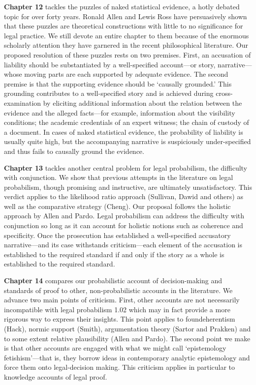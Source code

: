 \documentclass[
  10pt,
  dvipsnames,enabledeprecatedfontcommands]{scrartcl}
\begin{document}
\textbf{Chapter 12} tackles the puzzles of naked statistical evidence, a
hotly debated topic for over forty years. Ronald Allen and Lewis Ross
have persuasively shown that these puzzles are theoretical constructions
with little to no significance for legal practice. We still devote an
entire chapter to them because of the enormous scholarly attention they
have garnered in the recent philosophical literature. Our proposed
resolution of these puzzles rests on two premises. First, an accusation
of liability should be substantiated by a well-specified account---or
story, narrative---whose moving parts are each supported by adequate
evidence. The second premise is that the supporting evidence should be
`causally grounded.' This grounding contributes to a well-specified
story and is achieved during cross-examination by eliciting additional
information about the relation between the evidence and the alleged
facts---for example, information about the visibility conditions; the
academic credentials of an expert witness; the chain of custody of a
document. In cases of naked statistical evidence, the probability of
liability is usually quite high, but the accompanying narrative is
suspiciously under-specified and thus fails to causally ground the
evidence.

\textbf{Chapter 13} tackles another central problem for legal
probabilism, the difficulty with conjunction. We show that previous
attempts in the literature on legal probabilism, though promising and
instructive, are ultimately unsatisfactory. This verdict applies to the
likelihood ratio approach (Sullivan, Dawid and others) as well as the
comparative strategy (Cheng). Our proposal follows the holistic approach
by Allen and Pardo. Legal probabilism can address the difficulty with
conjunction so long as it can account for holistic notions such as
coherence and specificity. Once the prosecution has established a
well-specified accusatory narrative---and its case withstands
criticism---each element of the accusation is established to the
required standard if and only if the story as a whole is established to
the required standard.

\textbf{Chapter 14} compares our probabilistic account of
decision-making and standards of proof to other, non-probabilistic
accounts in the literature. We advance two main points of criticism.
First, other accounts are not necessarily incompatible with legal
probabilism 1.02 which may in fact provide a more rigorous way to
express their insights. This point applies to foundeherentism (Hack),
normic support (Smith), argumentation theory (Sartor and Prakken) and to
some extent relative plausibility (Allen and Pardo). The second point we
make is that other accounts are engaged with what we might call
`epistemology fetishism'---that is, they borrow ideas in contemporary
analytic epistemology and force them onto legal-decision making. This
criticism applies in particular to knowledge accounts of legal proof.
\end{document}
